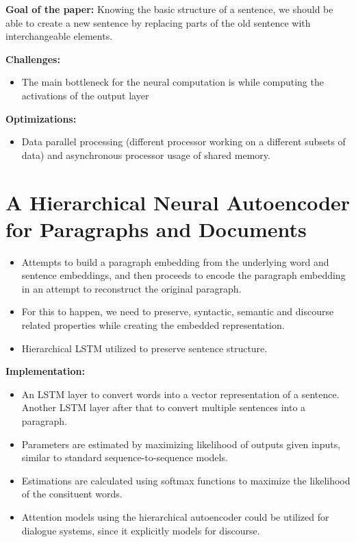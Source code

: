 \documentclass[11pt,a4paper]{article}
\begin{document}
  \textbf{Goal of the paper:}
  Knowing the basic structure of a sentence, we should be able to create a new sentence by replacing parts of the old sentence with interchangeable elements.

  \textbf{Challenges:}
  \begin{itemize}
    \item 
    The main bottleneck for the neural computation is while computing the activations of the output layer
  \end{itemize}

  \textbf{Optimizations:}
  \begin{itemize}
    \item 
    Data parallel processing (different processor working on a different subsets of data) and asynchronous processor usage of shared memory.
  \end{itemize}



\section{A Hierarchical Neural Autoencoder for Paragraphs and Documents} %
\label{sec:a_hierarchical_neural_autoencoder_for_paragraphs_and_documents}

  \begin{itemize}
    \item 
    Attempts to build a paragraph embedding from the underlying word and sentence embeddings, and then proceeds to encode the paragraph embedding in an attempt to reconstruct the original paragraph.
    \item 
    For this to happen, we need to preserve, syntactic, semantic and discourse related properties while creating the embedded representation.
    \item 
    Hierarchical LSTM utilized to preserve sentence structure.
  \end{itemize}

  \textbf{Implementation:}
  \begin{itemize}
    \item 
    An LSTM layer to convert words into a vector representation of a sentence. Another LSTM layer after that to convert multiple sentences into a paragraph.
    \item 
    Parameters are estimated by maximizing likelihood of outputs given inputs, similar to standard sequence-to-sequence models.
    \item 
    Estimations are calculated using softmax functions to maximize the likelihood of the consituent words.
    \item 
    Attention models using the hierarchical autoencoder could be utilized for dialogue systems, since it explicitly models for discourse.
  \end{itemize}
\end{document}
